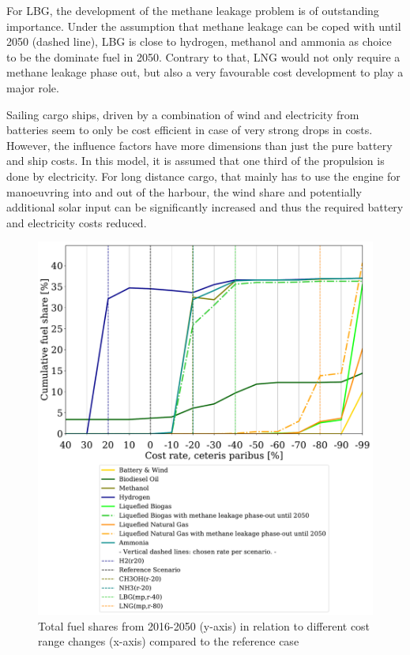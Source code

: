 \documentclass[article]{elsarticle}
\begin{document}
For LBG, the development of the methane leakage problem is of outstanding importance. Under the assumption that methane leakage can be coped with until 2050 (dashed line), LBG is close to hydrogen, methanol and ammonia as choice to be the dominate fuel in 2050. Contrary to that, LNG would not only require a methane leakage phase out, but also a very favourable cost development to play a major role.

Sailing cargo ships, driven by a combination of wind and electricity from batteries seem to only be cost efficient in case of very strong drops in costs. However, the influence factors have more dimensions than just the pure battery and ship costs. In this model, it is assumed that one third of the propulsion is done by electricity. For long distance cargo, that mainly has to use the engine for manoeuvring into and out of the harbour, the wind share and potentially additional solar input can be significantly increased and thus the required battery and electricity costs reduced.

\begin{figure}[htb]
    \centering
    \includegraphics[width=\textwidth]{figures/costVariation.pdf}
    \caption{Total fuel shares from 2016-2050 (y-axis) in relation to different cost range changes (x-axis) compared to the reference case}
    \label{fig:costVariation}
\end{figure}
\end{document}
